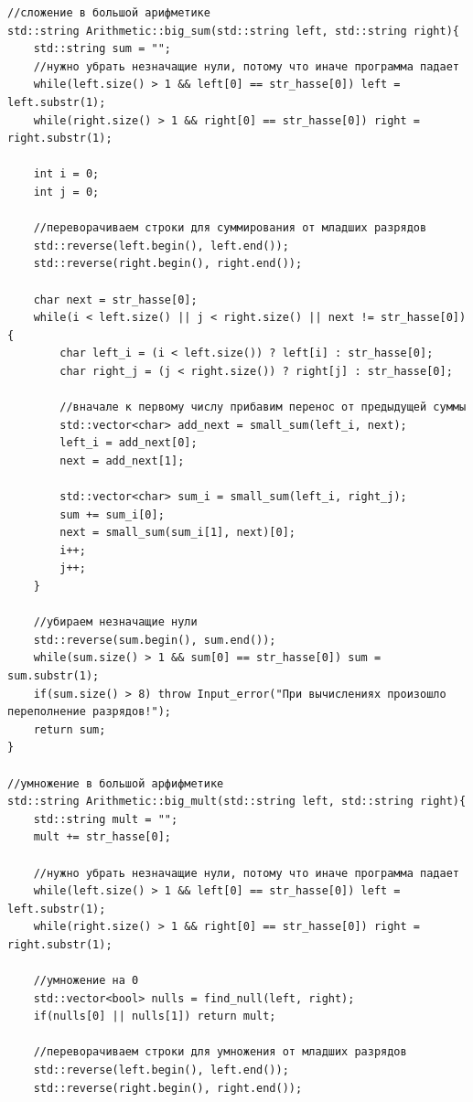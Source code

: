 \begin{lstlisting}[caption=big\_sum и big\_mult, label=lst:big-sum и big-mult]
//сложение в большой арифметике
std::string Arithmetic::big_sum(std::string left, std::string right){
    std::string sum = "";
    //нужно убрать незначащие нули, потому что иначе программа падает
    while(left.size() > 1 && left[0] == str_hasse[0]) left = left.substr(1);
    while(right.size() > 1 && right[0] == str_hasse[0]) right = right.substr(1);

    int i = 0;
    int j = 0;

    //переворачиваем строки для суммирования от младших разрядов
    std::reverse(left.begin(), left.end());
    std::reverse(right.begin(), right.end());

    char next = str_hasse[0];
    while(i < left.size() || j < right.size() || next != str_hasse[0]){
        char left_i = (i < left.size()) ? left[i] : str_hasse[0];
        char right_j = (j < right.size()) ? right[j] : str_hasse[0];

        //вначале к первому числу прибавим перенос от предыдущей суммы
        std::vector<char> add_next = small_sum(left_i, next);
        left_i = add_next[0];
        next = add_next[1];

        std::vector<char> sum_i = small_sum(left_i, right_j);
        sum += sum_i[0];
        next = small_sum(sum_i[1], next)[0];
        i++;
        j++;
    }
    
    //убираем незначащие нули
    std::reverse(sum.begin(), sum.end());
    while(sum.size() > 1 && sum[0] == str_hasse[0]) sum = sum.substr(1);
    if(sum.size() > 8) throw Input_error("При вычислениях произошло переполнение разрядов!");
    return sum;
}

//умножение в большой арфифметике
std::string Arithmetic::big_mult(std::string left, std::string right){
    std::string mult = "";
    mult += str_hasse[0];

    //нужно убрать незначащие нули, потому что иначе программа падает
    while(left.size() > 1 && left[0] == str_hasse[0]) left = left.substr(1);
    while(right.size() > 1 && right[0] == str_hasse[0]) right = right.substr(1);

    //умножение на 0
    std::vector<bool> nulls = find_null(left, right);
    if(nulls[0] || nulls[1]) return mult;

    //переворачиваем строки для умножения от младших разрядов
    std::reverse(left.begin(), left.end());
    std::reverse(right.begin(), right.end());


\end{lstlisting}
